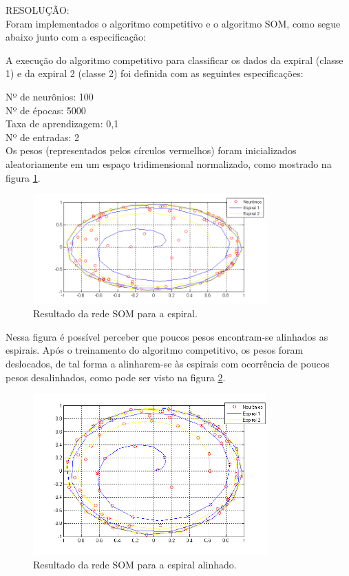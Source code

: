 \documentclass[a4paper,oneside,12pt]{article}
\begin{document}
\begin{enumerate}[1.]
RESOLU\c{C}\~AO: \\

Foram implementados o algoritmo competitivo e o algoritmo SOM, como segue abaixo junto com a especifica\c{c}\~ao:

A execu\c{c}\~ao do algoritmo competitivo para classificar os dados da expiral (classe 1) e da expiral 2 (classe 2) foi definida com as seguintes especifica\c{c}\~oes:

Nº de neur\^onios: 100 \\
Nº de \'epocas: 5000 \\
Taxa de aprendizagem: 0,1 \\
Nº de entradas: 2 \\

Os pesos (representados pelos c\'irculos vermelhos) foram inicializados aleatoriamente em um espa\c{c}o tridimensional normalizado, como mostrado na figura \ref{fig:q7_1}.

\begin{figure}[h]
\centering
\includegraphics[width=0.8\textwidth]{q7_1.png}
\caption{Resultado da rede SOM para a espiral.}
\label{fig:q7_1}
\end{figure}

Nessa figura \'e poss\'ivel perceber que poucos pesos encontram-se alinhados as espirais.
Ap\'os o treinamento do algoritmo competitivo, os pesos foram deslocados, de tal forma a alinharem-se \`as espirais com ocorr\^encia de poucos pesos desalinhados, como pode ser visto na figura \ref{fig:q7_2}.

\begin{figure}[h]
\centering
\includegraphics[width=0.8\textwidth]{q7_2.png}
\caption{Resultado da rede SOM para a espiral alinhado.}
\label{fig:q7_2}
\end{figure}


\end{enumerate}
\end{document}

